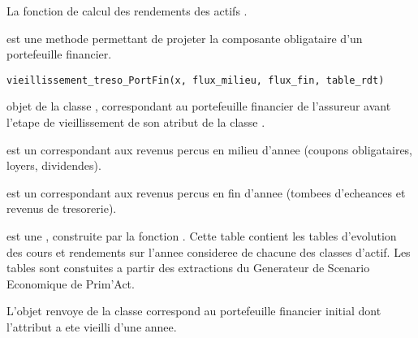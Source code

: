 \documentclass[a4paper]{book}
\begin{document}
%
\begin{SeeAlso}\relax
La fonction de calcul des rendements des actifs .
\end{SeeAlso}
%
\begin{Description}\relax
{} est une methode permettant de projeter la composante obligataire d'un portefeuille financier.
\end{Description}
%
\begin{Usage}
\begin{verbatim}
vieillissement_treso_PortFin(x, flux_milieu, flux_fin, table_rdt)
\end{verbatim}
\end{Usage}
%
\begin{Arguments}
\begin{ldescription}
\item[\code{x}] objet de la classe , correspondant au portefeuille financier de l'assureur avant l'etape de vieillissement de son atribut  de la classe .

\item[\code{flux\_milieu}] est un  correspondant aux revenus percus en milieu d'annee (coupons obligataires, loyers, dividendes).

\item[\code{flux\_fin}] est un  correspondant aux revenus percus en fin d'annee (tombees d'echeances et revenus de tresorerie).

\item[\code{table\_rdt}] est une , construite par la fonction .
Cette table contient les tables d'evolution des cours et rendements sur l'annee consideree de chacune des classes d'actif.
Les tables sont constuites a partir des extractions du Generateur de Scenario Economique de Prim'Act.
\end{ldescription}
\end{Arguments}
%
\begin{Value}
L'objet renvoye de la classe  correspond au portefeuille financier initial dont l'attribut  a ete vieilli d'une annee.
\end{Value}
\end{document}
